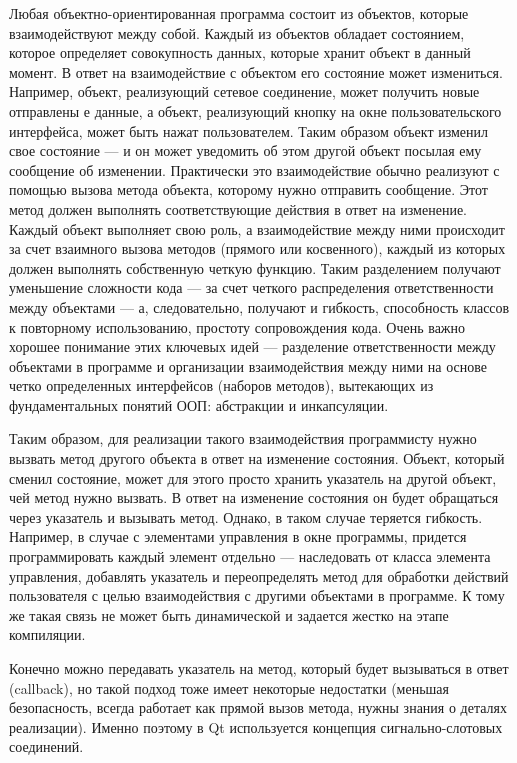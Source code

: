 Любая объектно-ориентированная программа состоит из объектов, которые взаимодействуют между собой. Каждый из объектов
обладает состоянием, которое определяет совокупность данных, которые хранит объект в данный момент. В ответ на
взаимодействие с объектом его состояние может измениться. 
Например, объект, реализующий сетевое соединение, может получить новые отправлены е
данные, а объект, реализующий кнопку на окне пользовательского интерфейса, 
может быть нажат пользователем. Таким образом объект изменил свое состояние --- 
и он может уведомить об этом другой объект посылая ему сообщение об 
изменении.
Практически это взаимодействие обычно реализуют с помощью вызова метода объекта, которому нужно
отправить сообщение. Этот метод должен выполнять соответствующие действия в ответ на изменение. Каждый объект выполняет
свою роль, а взаимодействие между ними происходит за счет взаимного вызова методов (прямого или косвенного), каждый из
которых должен выполнять собственную четкую функцию. Таким разделением получают уменьшение сложности кода --- за счет
четкого распределения ответственности между объектами --- а, следовательно, получают и гибкость, способность классов к
повторному использованию, простоту сопровождения кода. Очень важно хорошее понимание этих ключевых идей ---
разделение ответственности между объектами в программе и организации взаимодействия между ними на основе четко
определенных интерфейсов (наборов методов), вытекающих из фундаментальных понятий ООП: абстракции и инкапсуляции.

Таким образом, для реализации такого взаимодействия программисту нужно вызвать метод другого объекта в ответ на
изменение состояния. Объект, который сменил состояние, может для этого просто хранить указатель на другой объект, чей
метод нужно вызвать. В ответ на изменение состояния он будет обращаться через указатель и вызывать метод. Однако, в
таком случае теряется гибкость. Например, в случае с элементами управления в  окне программы, придется программировать
каждый элемент отдельно --- наследовать от класса элемента управления, добавлять указатель и  переопределять метод для
обработки действий пользователя с целью взаимодействия с другими объектами в программе. К тому же такая связь не может
быть динамической и задается жестко на этапе компиляции.

Конечно можно передавать указатель на метод, который будет вызываться в ответ (callback), но такой подход тоже имеет
некоторые недостатки (меньшая безопасность, всегда работает как прямой вызов метода, нужны знания о деталях
реализации). Именно поэтому в Qt используется концепция сигнально-слотовых соединений.

